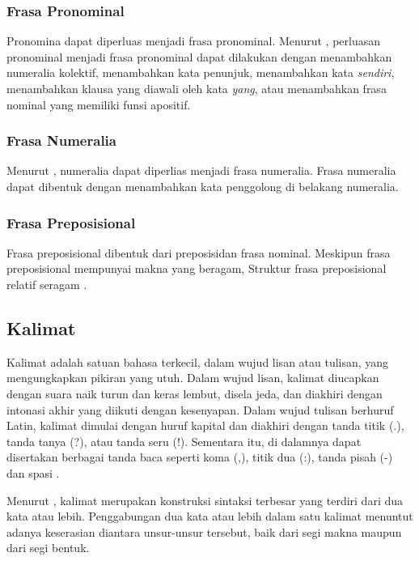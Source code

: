 \subsubsection{Frasa Pronominal}
Pronomina dapat diperluas menjadi frasa pronominal. Menurut \citet{alwi}, perluasan pronominal menjadi frasa pronominal dapat dilakukan dengan menambahkan numeralia kolektif, menambahkan kata penunjuk, menambahkan kata \emph{sendiri}, menambahkan klausa yang diawali oleh kata \emph{yang}, atau menambahkan frasa nominal yang memiliki funsi apositif.

\subsubsection{Frasa Numeralia}
Menurut \citet{alwi}, numeralia dapat diperlias menjadi frasa numeralia. Frasa numeralia dapat dibentuk dengan menambahkan kata penggolong di belakang numeralia.

\subsubsection{Frasa Preposisional}
Frasa preposisional dibentuk dari preposisidan frasa nominal. Meskipun frasa preposisional mempunyai makna yang beragam, Struktur frasa preposisional relatif seragam \citep{lapoliwa}.

\subsection{Kalimat}
Kalimat adalah satuan bahasa terkecil, dalam wujud lisan atau tulisan, yang mengungkapkan pikiran yang utuh. Dalam wujud lisan, kalimat diucapkan dengan suara naik turun dan keras lembut, disela jeda, dan diakhiri dengan intonasi akhir yang diikuti dengan kesenyapan. Dalam wujud tulisan berhuruf Latin, kalimat dimulai dengan huruf kapital dan diakhiri dengan tanda titik (.), tanda tanya (?), atau tanda seru (!). Sementara itu, di dalamnya dapat disertakan berbagai tanda baca seperti koma (,), titik dua (:), tanda pisah (-) dan spasi \citep{alwi}.

Menurut \citet{alwi}, kalimat merupakan konstruksi sintaksi terbesar yang terdiri dari dua kata atau lebih. Penggabungan dua kata atau lebih dalam satu kalimat menuntut adanya keserasian diantara unsur-unsur tersebut, baik dari segi makna maupun dari segi bentuk.

